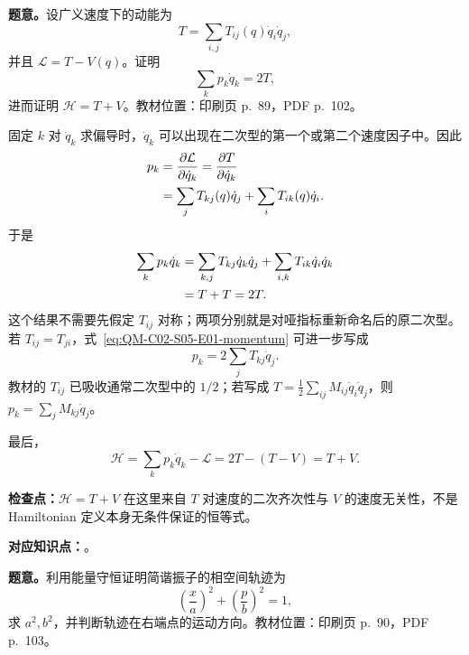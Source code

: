 \textbf{题意。}设广义速度下的动能为
\begin{equation}
  T=\sum_{i,j}T_{ij}(q)\dot q_i\dot q_j,
  \label{eq:QM-C02-S05-E01-kinetic-energy}
\end{equation}
并且 $\mathcal L=T-V(q)$。证明
\[
  \sum_kp_k\dot q_k=2T,
\]
进而证明 $\mathcal H=T+V$。教材位置：印刷页 p.~89，PDF p.~102。

\begin{checkedsolution}
固定 $k$ 对 $\dot q_k$ 求偏导时，$\dot q_k$ 可以出现在二次型的第一个或第二个速度因子中。因此
\begin{align}
  p_k
  &=\frac{\partial\mathcal L}{\partial\dot q_k}
    =\frac{\partial T}{\partial\dot q_k} \notag\\
  &=\sum_jT_{kj}(q)\dot q_j
    +\sum_iT_{ik}(q)\dot q_i.
  \label{eq:QM-C02-S05-E01-momentum}
\end{align}
于是
\begin{align}
  \sum_kp_k\dot q_k
  &=\sum_{k,j}T_{kj}\dot q_k\dot q_j
    +\sum_{i,k}T_{ik}\dot q_i\dot q_k \notag\\
  &=T+T=2T.
  \label{eq:QM-C02-S05-E01-homogeneous-identity}
\end{align}
这个结果不需要先假定 $T_{ij}$ 对称；两项分别就是对哑指标重新命名后的原二次型。若 $T_{ij}=T_{ji}$，式~\eqref{eq:QM-C02-S05-E01-momentum} 可进一步写成
\[
  p_k=2\sum_jT_{kj}\dot q_j.
\]
教材的 $T_{ij}$ 已吸收通常二次型中的 $1/2$；若写成 $T=\frac12\sum_{ij}M_{ij}\dot q_i\dot q_j$，则 $p_k=\sum_jM_{kj}\dot q_j$。

最后，
\begin{equation}
  \boxed{
  \mathcal H=\sum_kp_k\dot q_k-\mathcal L
  =2T-(T-V)=T+V.}
  \label{eq:QM-C02-S05-E01-hamiltonian-energy}
\end{equation}
\end{checkedsolution}

\textbf{检查点：}$\mathcal H=T+V$ 在这里来自 $T$ 对速度的二次齐次性与 $V$ 的速度无关性，不是 Hamiltonian 定义本身无条件保证的恒等式。


\textbf{对应知识点：}。

\textbf{题意。}利用能量守恒证明简谐振子的相空间轨迹为
\[
  \left(\frac xa\right)^2+\left(\frac pb\right)^2=1,
\]
求 $a^2,b^2$，并判断轨迹在右端点的运动方向。教材位置：印刷页 p.~90，PDF p.~103。

